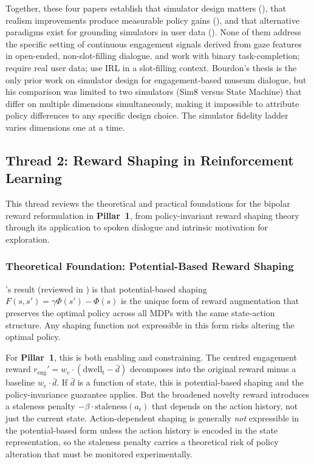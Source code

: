 \documentclass[a4paper, 11pt]{article}
\newcommand{\reng}{r_{\mathrm{eng}}}
\newcommand{\dwell}{\mathrm{dwell}_t}
\newcommand{\pillar}[1]{\textbf{Pillar~#1}}
\begin{document}
Together, these four papers establish that simulator design matters (\citealp{kreyssig2019neural}), that realism improvements produce measurable policy gains (\citealp{yang2023adversarial}), and that alternative paradigms exist for grounding simulators in user data (\citealp{chandramohan2011user}). None of them address the specific setting of continuous engagement signals derived from gaze features in open-ended, non-slot-filling dialogue. \citet{li2016user} and \citet{kreyssig2019neural} work with binary task-completion; \citet{yang2023adversarial} require real user data; \citet{chandramohan2011user} use IRL in a slot-filling context. Bourdon's thesis is the only prior work on simulator design for engagement-based museum dialogue, but his comparison was limited to two simulators (Sim8 versus State Machine) that differ on multiple dimensions simultaneously, making it impossible to attribute policy differences to any specific design choice. The simulator fidelity ladder varies dimensions one at a time.

\subsection{Thread 2: Reward Shaping in Reinforcement Learning}
\label{sec:lit_reward}

This thread reviews the theoretical and practical foundations for the bipolar reward reformulation in \pillar{1}, from policy-invariant reward shaping theory through its application to spoken dialogue and intrinsic motivation for exploration.

\subsubsection{Theoretical Foundation: Potential-Based Reward Shaping}

\citet{ng1999policy}'s result (reviewed in ) is that potential-based shaping $F(s, s') = \gamma \Phi(s') - \Phi(s)$ is the unique form of reward augmentation that preserves the optimal policy across all MDPs with the same state-action structure. Any shaping function not expressible in this form risks altering the optimal policy.

For \pillar{1}, this is both enabling and constraining. The centred engagement reward $\reng' = w_e \cdot (\dwell - \bar{d})$ decomposes into the original reward minus a baseline $w_e \cdot \bar{d}$. If $\bar{d}$ is a function of state, this is potential-based shaping and the policy-invariance guarantee applies. But the broadened novelty reward introduces a staleness penalty $-\beta \cdot \mathrm{staleness}(a_t)$ that depends on the action history, not just the current state. Action-dependent shaping is generally \emph{not} expressible in the potential-based form unless the action history is encoded in the state representation, so the staleness penalty carries a theoretical risk of policy alteration that must be monitored experimentally.
\end{document}
